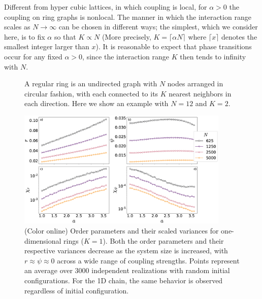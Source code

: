 Different from hyper cubic lattices, in which coupling is local, for $\alpha > 0$ the coupling on ring graphs is nonlocal.  The manner
in which the interaction range scales as $N\to\infty$ can be chosen in different ways; the simplest, which we consider here, is to fix
$\alpha$ so that $K \propto N$ (More precisely,  $K=\lceil\alpha N\rceil$ where $\lceil x \rceil$ denotes the smallest integer larger
than $x$).  It is reasonable to expect that phase transitions occur for any fixed $\alpha > 0$, since the interaction range $K$ then
tends to infinity with $N$. 

\begin{figure}[b]
\begin{center}
\caption{\label{fig:ring}
    A regular ring is an undirected graph with $N$ nodes arranged in circular
    fashion, with each connected to its $K$ nearest neighbors in each direction.
    Here we show an example with $N=12$ and $K=2$.
    }
\end{center}
\end{figure}

\begin{figure}[t]
\begin{center}
    \includegraphics[width=0.9\textwidth]{fig/chap2/chi_curves_1D.eps}
\caption{\label{fig:chi_curves_1D}
    (Color online) Order parameters and their scaled variances for
    one-dimensional rings ($K=1$). Both the order parameters and their
    respective variances decrease as the system size is increased, with $r
    \approx \psi \approx 0$ across a wide range of coupling strengths. Points
    represent an average over 3000 independent realizations with random initial
    configurations. For the 1D chain, the same behavior is observed regardless
    of initial configuration.
    }
\end{center}
\end{figure}

